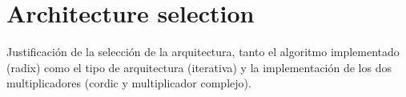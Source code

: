 \section{Architecture selection}
Justificación de la selección de la arquitectura, tanto el algoritmo implementado (radix) como el tipo de arquitectura 
(iterativa) y la implementación de los dos multiplicadores (cordic y multiplicador complejo).